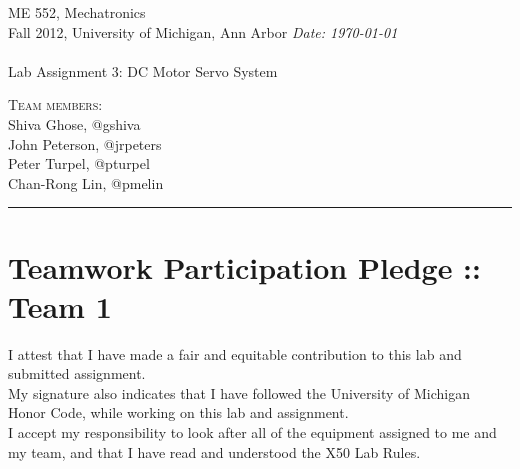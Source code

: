 \documentclass{article}
\newcommand{\shortbar}{\begin{center}\rule{5ex}{0.1pt}\end{center}}
\newcommand{\courseNumber}{ME 552}
\newcommand{\courseTitle}{Mechatronics}
\newcommand{\semester}{Fall 2012}
\theoremstyle{plain}
\theoremstyle{definition}
\theoremstyle{remark}
\newenvironment{solution}[1]{\medskip\noindent{\bf Problem #1.~}}{\shortbar}
\newcommand{\solutions}[4]{
\vspace{-2ex}
\begin{center}
{\small  \courseNumber, \courseTitle
\hfill {\Large \bf {#1} }\\
\semester, University of Michigan, Ann Arbor \hfill
{\em Date: #3}}\\
\vspace{-1ex}
\hrulefill\\
\vspace{4ex}
{\LARGE Lab Assignment #2}\\
\vspace{2ex}
\end{center}
\begin{trivlist}
\item \textsc{Team members:\\} {#4}
\end{trivlist}
\noindent
\shortbar
\vspace{3ex}
}
\begin{document}
\solutions{}{3: DC Motor Servo System}{\today}{Shiva Ghose, @gshiva\\ John Peterson, @jrpeters\\ Peter Turpel, @pturpel\\ Chan-Rong Lin, @pmelin}
%
%
\section*{Teamwork Participation Pledge :: Team 1}

I attest that I have made a fair and equitable contribution to this lab and submitted 
assignment. \\

My signature also indicates that I have followed the University of Michigan Honor Code, 
while working on this lab and assignment.\\

I accept my responsibility to look after all of the equipment assigned to me and my team, 
and that I have read and understood the X50 Lab Rules.\\
\end{document}
